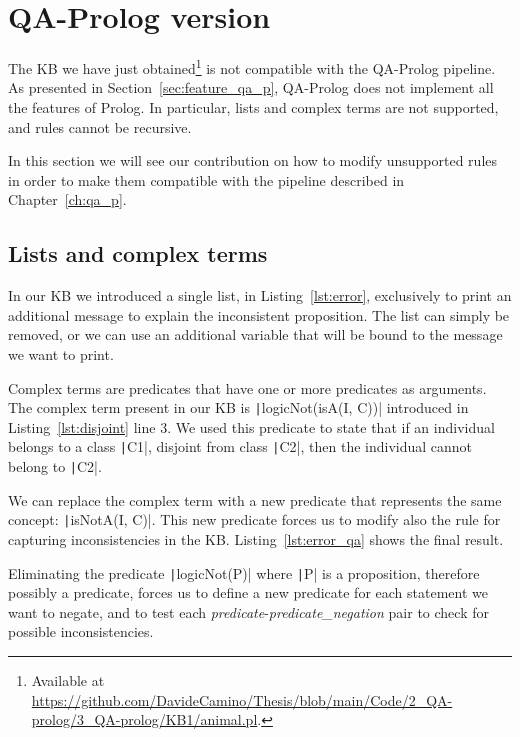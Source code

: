 \section{QA-Prolog version}
The KB we have just obtained\footnote{Available at \url{https://github.com/DavideCamino/Thesis/blob/main/Code/2_QA-prolog/3_QA-prolog/KB1/animal.pl}.} is not compatible with the QA-Prolog pipeline. As presented in Section~\ref{sec:feature_qa_p}, QA-Prolog does not implement all the features of Prolog. In particular, lists and complex terms are not supported, and rules cannot be recursive.

In this section we will see our contribution on how to modify unsupported rules in order to make them compatible with the pipeline described in Chapter~\ref{ch:qa_p}.

\subsection{Lists and complex terms}
In our KB we introduced a single list, in Listing~\ref{lst:error}, exclusively to print an additional message to explain the inconsistent proposition. The list can simply be removed, or we can use an additional variable that will be bound to the message we want to print.

Complex terms are predicates that have one or more predicates as arguments. The complex term present in our KB is \texttt|logicNot(isA(I, C))| introduced in Listing~\ref{lst:disjoint} line $3$. We used this predicate to state that if an individual belongs to a class \texttt|C1|, disjoint from class \texttt|C2|, then the individual cannot belong to \texttt|C2|. 

We can replace the complex term with a new predicate that represents the same concept: \texttt|isNotA(I, C)|. This new predicate forces us to modify also the rule for capturing inconsistencies in the KB. Listing~\ref{lst:error_qa} shows the final result.

\begin{listing}[h]
	\caption{List and complex term removal}
	\label{lst:error_qa}
\end{listing}

Eliminating the predicate \texttt|logicNot(P)| where \texttt|P| is a proposition, therefore possibly a predicate, forces us to define a new predicate for each statement we want to negate, and to test each \emph{predicate}-\emph{predicate\_negation} pair to check for possible inconsistencies.

